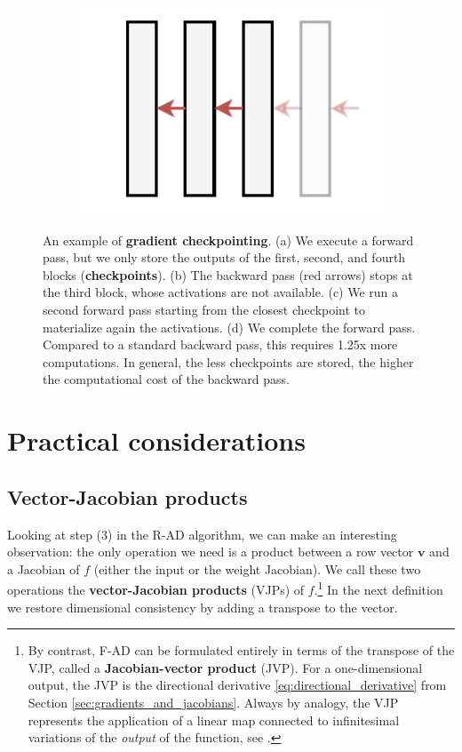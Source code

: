 \begin{figure}
\begin{subfigure}[b]{0.23\textwidth}
    \caption{}
    \end{subfigure}
    \hfill
    \begin{subfigure}[b]{0.23\textwidth}
    \includegraphics[width=1.0\textwidth]{images/gradient_checkpointing-Pagina-4}
    \caption{}
    \end{subfigure}
    \hfill
    \caption{An example of \textbf{gradient checkpointing}. (a) We execute a forward pass, but we only store the outputs of the first, second, and fourth blocks (\textbf{checkpoints}). (b) The backward pass (red arrows) stops at the third block, whose activations are not available. (c) We run a second forward pass starting from the closest checkpoint to materialize again the activations. (d) We complete the forward pass. Compared to a standard backward pass, this requires 1.25x more computations. In general, the less checkpoints are stored, the higher the computational cost of the backward pass.}
    \label{fig:gradient_checkpointing}
\end{figure}

\section{Practical considerations}

\subsection{Vector-Jacobian products}

Looking at step (3) in the R-AD algorithm, we can make an interesting observation: the only operation we need is a product between a row vector $\mathbf{v}$ and a Jacobian of $f$ (either the input or the weight Jacobian). We call these two operations the \textbf{vector-Jacobian products} (VJPs) of $f$.\footnote{By contrast, F-AD can be formulated entirely in terms of the transpose of the VJP, called a \textbf{Jacobian-vector product} (JVP). For a one-dimensional output, the JVP is the directional derivative \eqref{eq:directional_derivative} from Section \ref{sec:gradients_and_jacobians}. Always by analogy, the VJP represents the application of a linear map connected to infinitesimal variations of the \textit{output} of the function, see \cite{blondel2024elements}.} In the next definition we restore dimensional consistency by adding a transpose to the vector.

